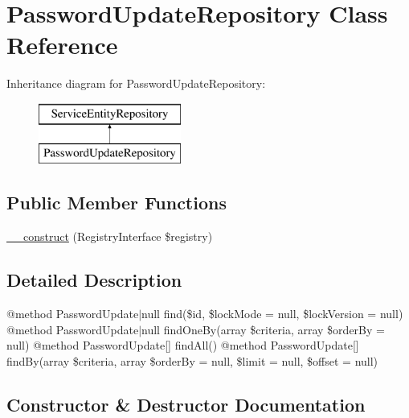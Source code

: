 \hypertarget{class_app_1_1_repository_1_1_password_update_repository}{}\section{Password\+Update\+Repository Class Reference}
\label{class_app_1_1_repository_1_1_password_update_repository}
Inheritance diagram for Password\+Update\+Repository\+:\begin{figure}[H]
\begin{center}
\leavevmode
\includegraphics[height=2.000000cm]{class_app_1_1_repository_1_1_password_update_repository}
\end{center}
\end{figure}
\subsection*{Public Member Functions}
\begin{DoxyCompactItemize}
\item 
\mbox{\hyperlink{class_app_1_1_repository_1_1_password_update_repository_aadca7edd263e228921a1860bb6b9c252}{\+\_\+\+\_\+construct}} (Registry\+Interface \$registry)
\end{DoxyCompactItemize}


\subsection{Detailed Description}
@method Password\+Update$\vert$null find(\$id, \$lock\+Mode = null, \$lock\+Version = null) @method Password\+Update$\vert$null find\+One\+By(array \$criteria, array \$order\+By = null) @method Password\+Update\mbox{[}\mbox{]} find\+All() @method Password\+Update\mbox{[}\mbox{]} find\+By(array \$criteria, array \$order\+By = null, \$limit = null, \$offset = null) 

\subsection{Constructor \& Destructor Documentation}
\mbox{\label{class_app_1_1_repository_1_1_password_update_repository_aadca7edd263e228921a1860bb6b9c252}} 

